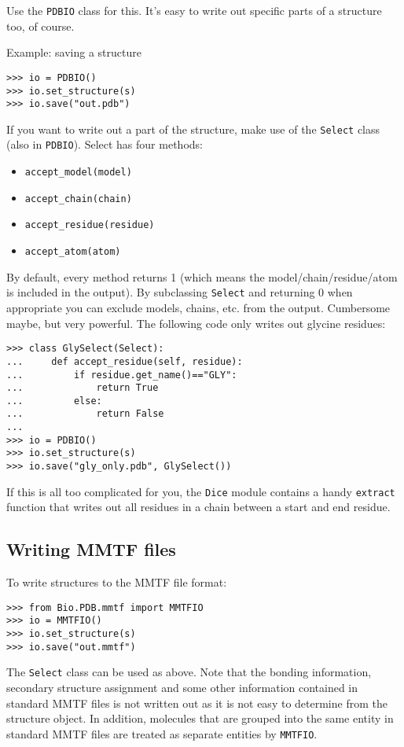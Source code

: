 Use the \texttt{PDBIO} class for this. It's easy to write out specific parts
of a structure too, of course.

Example: saving a structure

\begin{verbatim}
>>> io = PDBIO()
>>> io.set_structure(s)
>>> io.save("out.pdb")
\end{verbatim}
If you want to write out a part of the structure, make use of the
\texttt{Select} class (also in \texttt{PDBIO}). Select has four methods:

\begin{itemize}
\item \verb+accept_model(model)+
\item \verb+accept_chain(chain)+
\item \verb+accept_residue(residue)+
\item \verb+accept_atom(atom)+
\end{itemize}
By default, every method returns 1 (which means the model/\-chain/\-residue/\-atom
is included in the output). By subclassing \texttt{Select} and returning
0 when appropriate you can exclude models, chains, etc. from the output.
Cumbersome maybe, but very powerful. The following code only writes
out glycine residues:

\begin{verbatim}
>>> class GlySelect(Select):
...     def accept_residue(self, residue):
...         if residue.get_name()=="GLY":
...             return True
...         else:
...             return False
...
>>> io = PDBIO()
>>> io.set_structure(s)
>>> io.save("gly_only.pdb", GlySelect())
\end{verbatim}
If this is all too complicated for you, the \texttt{Dice} module contains
a handy \texttt{extract} function that writes out all residues in
a chain between a start and end residue.

\subsection{Writing MMTF files}

To write structures to the MMTF file format:

\begin{verbatim}
>>> from Bio.PDB.mmtf import MMTFIO
>>> io = MMTFIO()
>>> io.set_structure(s)
>>> io.save("out.mmtf")
\end{verbatim}

The \texttt{Select} class can be used as above. Note that the bonding
information, secondary structure assignment and some other information contained
in standard MMTF files is not written out as it is not easy to determine from
the structure object. In addition, molecules that are grouped into the same
entity in standard MMTF files are treated as separate entities by
\texttt{MMTFIO}.


